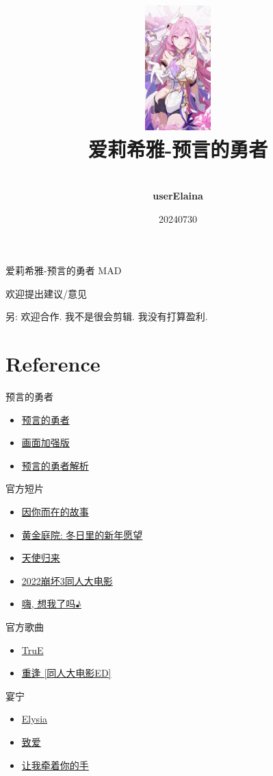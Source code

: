 \documentclass[a4paper]{article}
\title{
    \vspace*{1.0in}
    \includegraphics[width=1in]{figures/100154449_p0.jpg} \\
    \vspace*{1in}
    \textbf{\Huge 爱莉希雅-预言的勇者}
    \vspace{0.5in}
}
\author{ \\
    \textbf{\huge userElaina} \\
    \vspace*{1in}
}
\date{\LARGE 20240730}
\begin{document}
\LARGE

\maketitle
\tableofcontents
\thispagestyle{empty}
\newpage

爱莉希雅-预言的勇者 MAD

欢迎提出建议/意见

另: 欢迎合作. 我不是很会剪辑. 我没有打算盈利.

\section{Reference}

预言的勇者

\begin{itemize}
    \item \href{https://www.bilibili.com/video/BV1Zf4y1Z75m/}{预言的勇者}
    \item \href{https://www.bilibili.com/video/BV1rr4y177C9/}{画面加强版}
    \item \href{https://www.bilibili.com/video/BV1KT411z7Vr/}{预言的勇者解析}
\end{itemize}

官方短片

\begin{itemize}
    \item \href{https://www.bilibili.com/video/BV1fY4y1F7GL/}{因你而在的故事}
    \item \href{https://www.bilibili.com/video/BV1oA411o7zD/}{黄金庭院: 冬日里的新年愿望}
    \item \href{https://www.bilibili.com/video/BV1pp4y1m7Uh/}{天使归来}
    \item \href{https://www.bilibili.com/video/BV1Nt4y1w7tE/}{2022崩坏3同人大电影}
    \item \href{https://www.bilibili.com/video/BV1LD4y117nq/}{嗨, 想我了吗♪}
\end{itemize}

官方歌曲

\begin{itemize}
    \item \href{https://www.bilibili.com/video/BV1sg411y7cZ/}{TruE}
    \item \href{https://www.bilibili.com/video/BV17D4y117DV/}{重逢 [同人大电影ED]}
\end{itemize}

宴宁

\begin{itemize}
    \item \href{https://www.bilibili.com/video/BV1dq4y1N7ry/}{Elysia}
    \item \href{https://www.bilibili.com/video/BV1bB4y1L7qh/}{致爱}
    \item \href{https://www.bilibili.com/video/BV1te411h7aj/}{让我牵着你的手}
\end{itemize}
\end{document}
